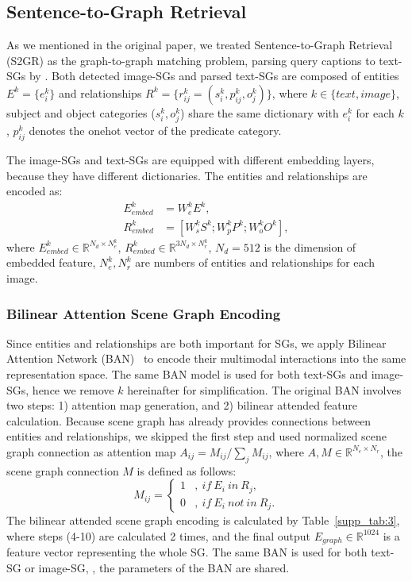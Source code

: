 \documentclass[10pt,twocolumn,letterpaper]{article}
\begin{document}
\subsection{Sentence-to-Graph Retrieval}
As we mentioned in the original paper, we treated Sentence-to-Graph Retrieval (S2GR) as the graph-to-graph matching problem, parsing query captions to text-SGs by \cite{schuster2015generating}. Both detected image-SGs and parsed text-SGs are composed of entities $E^k=\{e^k_i\}$ and relationships $R^k=\{r^k_{ij}=(s^k_i,p^k_{ij},o^k_j)\}$, where $k\in\{text, image\}$, subject and object categories ($s^k_i,o^k_j$) share the same dictionary with $e^k_i$ for each $k$, $p^k_{ij}$ denotes the onehot vector of the predicate category. 

The image-SGs and text-SGs are equipped with different embedding layers, because they have different dictionaries. The entities and relationships are encoded as:
\begin{align}
    E_{embed}^k &= W_e^k E^k, \\ 
    R_{embed}^k &= [W_s^k S^k; W_p^k P^k; W_o^k O^k],
\end{align}
where $E_{embed}^k\in \mathbb{R}^{N_d \times N_e^k}$, $R_{embed}^k \in \mathbb{R}^{3N_d \times N_r^k}$, $N_d=512$ is the dimension of embedded feature, $N_e^k, N_r^k$ are numbers of entities and relationships for each image. 

\subsubsection{Bilinear Attention Scene Graph Encoding}
Since entities and relationships are both important for SGs, we apply Bilinear Attention Network (BAN)~\cite{kim2018bilinear} to encode their multimodal interactions into the same representation space. The same BAN model is used for both text-SGs and image-SGs, hence we remove $k$ hereinafter for simplification. The original BAN involves two steps: 1) attention map generation, and 2) bilinear attended feature calculation. Because scene graph has already provides connections between entities and relationships, we skipped the first step and used normalized scene graph connection as attention map $A_{ij}=M_{ij} / \sum_j M_{ij}$, where $A,M\in \mathbb{R}^{N_e \times N_r}$, the scene graph connection $M$ is defined as follows:
\begin{equation}
    M_{ij}= \left\{
    \begin{aligned}
        1 &,\ if\ E_i\ in\ R_j,\\
        0 &,\ if\ E_i\ not\ in\ R_j.
    \end{aligned}
    \right.
\end{equation}
The bilinear attended scene graph encoding is calculated by Table~\ref{supp_tab:3}, where steps (4-10) are calculated 2 times, and the final output $E_{graph}\in \mathbb{R}^{1024}$ is a feature vector representing the whole SG. The same BAN is used for both text-SG or image-SG, \ie, the parameters of the BAN are shared. 
\end{document}
